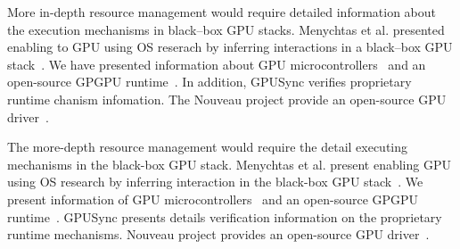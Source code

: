 More in-depth resource management would require detailed information about the execution mechanisms in black--box GPU stacks.
Menychtas et al. presented enabling to GPU using OS reserach by inferring interactions in a black--box GPU stack~\cite{menychtas2013enabling}.
We have presented information about GPU microcontrollers~\cite{fujii:apsys2013} and an open-source GPGPU runtime~\cite{kato:gdev}.
In addition, GPUSync verifies proprietary runtime chanism infomation.
The Nouveau project provide an open-source GPU driver~\cite{nouveau}.

The more-depth resource management would require the detail executing mechanisms in the black-box GPU stack.
Menychtas et al. present enabling GPU using OS research by inferring interaction in the black-box GPU stack~\cite{menychtas2013enabling}.
We present information of GPU microcontrollers~\cite{fujii:apsys2013} and an open-source GPGPU runtime~\cite{kato:gdev}.
GPUSync presents details verification information on the proprietary runtime mechanisms.
Nouveau project provides an open-source GPU driver~\cite{nouveau}.


